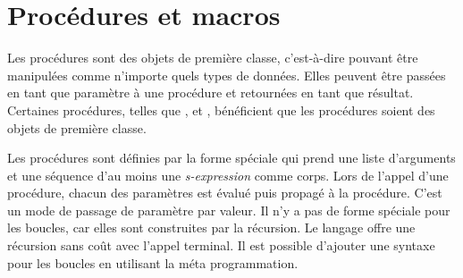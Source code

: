 \section{Procédures et macros}
\label{sec:proc_and_macro}

Les procédures sont des objets de première classe, c'est-à-dire pouvant
être manipulées comme n'importe quels types de données. Elles peuvent
être passées en tant que paramètre à une procédure et retournées en tant que
résultat.  Certaines procédures, telles que ,  et
, bénéficient que les procédures soient des objets de première classe.

Les procédures sont définies par la forme spéciale
 qui prend une liste d'arguments et une séquence d'au moins une
\textit{s-expression} comme corps. Lors de l'appel d'une procédure, chacun
des paramètres est évalué puis propagé à la procédure. C'est un mode de passage
de paramètre par valeur. Il n'y a pas de forme spéciale pour les boucles, car elles
sont construites par la récursion. Le langage offre une récursion sans coût
avec l'appel terminal.  Il est possible d'ajouter une syntaxe pour les boucles en
utilisant la méta programmation.






